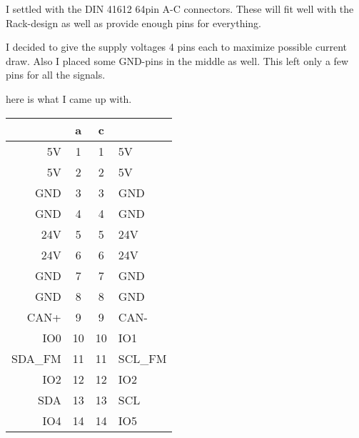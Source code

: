 I settled with the DIN 41612 64pin A-C connectors. These will fit well with the Rack-design as well as provide enough pins for everything. 

I decided to give the supply voltages 4 pins each to maximize possible current draw. Also I placed some GND-pins in the middle as well. This left only a few pins for all the signals. 

here is what I came up with.

\begin{table}[H]
\centering
\begin{tabular}{|r|c|c|l|}
                              	& 	a  	& 	c 	&   										\\ \hline \hline
\cellcolor[HTML]{FE0000}5V    	& 	1  	& 	1  	& 	\cellcolor[HTML]{FE0000}5V       		\\ \hline
\cellcolor[HTML]{FE0000}5V    	& 	2  	& 	2  	& 	\cellcolor[HTML]{FE0000}5V       		\\ \hline
\cellcolor[HTML]{0066ff}GND   	& 	3  	& 	3  	& 	\cellcolor[HTML]{0066ff}GND     		\\ \hline
\cellcolor[HTML]{0066ff}GND   	& 	4  	& 	4  	& 	\cellcolor[HTML]{0066ff}GND     		\\ \hline
\cellcolor[HTML]{FE0000}24V   	& 	5  	& 	5  	& 	\cellcolor[HTML]{FE0000}24V     		\\ \hline
\cellcolor[HTML]{FE0000}24V   	& 	6  	& 	6  	& 	\cellcolor[HTML]{FE0000}24V     		\\ \hline
\cellcolor[HTML]{0066ff}GND   	& 	7  	& 	7  	& 	\cellcolor[HTML]{0066ff}GND     		\\ \hline
\cellcolor[HTML]{0066ff}GND   	& 	8  	& 	8  	& 	\cellcolor[HTML]{0066ff}GND     		\\ \hline
\cellcolor[HTML]{9B9B9B}CAN+   	& 	9  	& 	9  	& 	\cellcolor[HTML]{9B9B9B}CAN-       		\\ \hline
\cellcolor[HTML]{F8FF00}IO0   	& 	10 	& 	10 	& 	\cellcolor[HTML]{F8FF00}IO1          	\\ \hline
\cellcolor[HTML]{9B9B9B}SDA\_FM  	& 	11 	& 	11 	& 	\cellcolor[HTML]{9B9B9B}SCL\_FM            	\\ \hline
\cellcolor[HTML]{F8FF00}IO2  	& 	12 	& 	12 	& 	\cellcolor[HTML]{F8FF00}IO2            	\\ \hline
\cellcolor[HTML]{9B9B9B}SDA    	& 	13 	& 	13 	& 	\cellcolor[HTML]{9B9B9B}SCL             	\\ \hline
\cellcolor[HTML]{F8FF00}IO4    	& 	14 	& 	14 	& 	\cellcolor[HTML]{F8FF00}IO5            	\\ \hline

\end{tabular}
\end{table}
